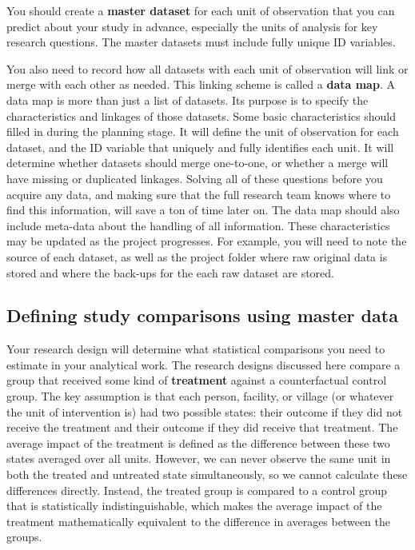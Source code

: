 You should create a \textbf{master dataset}
for each unit of observation
that you can predict about your study in advance,
especially the units of analysis for key research questions.
The master datasets must include fully unique ID variables.

You also need to record how all datasets with each unit of observation
will link or merge with each other as needed.
This linking scheme is called a \textbf{data map}.
A data map is more than just a list of datasets.
Its purpose is to specify the characteristics and linkages of those datasets.
Some basic characteristics should filled in during the planning stage.
It will define the unit of observation for each dataset,
and the ID variable that uniquely and fully identifies each unit.
It will determine whether datasets should merge one-to-one,
or whether a merge will have missing or duplicated linkages.
Solving all of these questions before you acquire any data,
and making sure that the full research team knows where to find this information,
will save a ton of time later on.
The data map should also include meta-data about the handling of all information.
These characteristics may be updated as the project progresses.
For example, you will need to note the source of each dataset,
as well as the project folder where raw original data is stored
and where the back-ups for the each raw dataset are stored.

\subsection{Defining study comparisons using master data}

Your research design will determine what statistical comparisons you need
to estimate in your analytical work.
The research designs discussed here compare a group that received
some kind of \textbf{treatment}
against a counterfactual control group.
The key assumption is that each
person, facility, or village (or whatever the unit of intervention is)
had two possible states: their outcome if they did not receive the treatment
and their outcome if they did receive that treatment.
The average impact of the treatment is defined as
the difference between these two states averaged over all units.
However, we can never observe the same unit
in both the treated and untreated state simultaneously,
so we cannot calculate these differences directly.
Instead, the treated group is compared to a control group
that is statistically indistinguishable,
which makes the average impact of the treatment
mathematically equivalent to the difference in averages between the groups.

